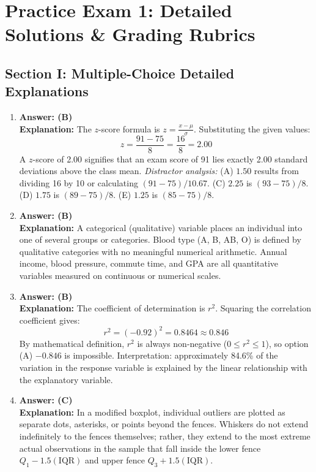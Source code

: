 \chapter{Practice Exam 1: Detailed Solutions \& Grading Rubrics}

\section{Section I: Multiple-Choice Detailed Explanations}

\begin{enumerate}[leftmargin=1.5em]
  \item \textbf{Answer: (B)} \\
  \textbf{Explanation:} The $z$-score formula is $z = \frac{x - \mu}{\sigma}$. Substituting the given values:
  \[ z = \frac{91 - 75}{8} = \frac{16}{8} = 2.00 \]
  A $z$-score of 2.00 signifies that an exam score of 91 lies exactly 2.00 standard deviations above the class mean.
  \textit{Distractor analysis:} (A) $1.50$ results from dividing 16 by 10 or calculating $(91-75)/10.67$. (C) $2.25$ is $(93-75)/8$. (D) $1.75$ is $(89-75)/8$. (E) $1.25$ is $(85-75)/8$.

  \item \textbf{Answer: (B)} \\
  \textbf{Explanation:} A categorical (qualitative) variable places an individual into one of several groups or categories. Blood type (A, B, AB, O) is defined by qualitative categories with no meaningful numerical arithmetic. Annual income, blood pressure, commute time, and GPA are all quantitative variables measured on continuous or numerical scales.

  \item \textbf{Answer: (B)} \\
  \textbf{Explanation:} The coefficient of determination is $r^2$. Squaring the correlation coefficient gives:
  \[ r^2 = (-0.92)^2 = 0.8464 \approx 0.846 \]
  By mathematical definition, $r^2$ is always non-negative ($0 \le r^2 \le 1$), so option (A) $-0.846$ is impossible. Interpretation: approximately 84.6\% of the variation in the response variable is explained by the linear relationship with the explanatory variable.

  \item \textbf{Answer: (C)} \\
  \textbf{Explanation:} In a modified boxplot, individual outliers are plotted as separate dots, asterisks, or points beyond the fences. Whiskers do not extend indefinitely to the fences themselves; rather, they extend to the most extreme actual observations in the sample that fall inside the lower fence $Q_1 - 1.5(\text{IQR})$ and upper fence $Q_3 + 1.5(\text{IQR})$.


\end{enumerate}
